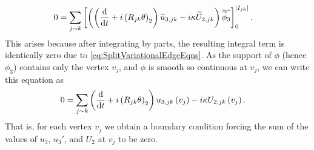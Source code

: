 \begin{align*}
	0 &= \sum_{j\sim k} \left[  \left(  \left( \dfrac{\mathrm{d}}{\mathrm{d}t} + i\left( R_{jk}\theta \right)_2 \right)\widetilde{u}_{3,jk} - i\kappa\widetilde{U}_{2,jk}  \right)\overline{\widetilde{\phi}_3}  \right]_0^{\left\lvert I_{jk} \right\rvert}.
\end{align*}
This arises because after integrating by parts, the resulting integral term is identically zero due to \eqref{eq:SplitVariationalEdgeEqns}.
As the support of $\phi$ (hence $\phi_3$) contains only the vertex $v_j$, and $\phi$ is smooth so continuous at $v_j$, we can write this equation as
\begin{align*}
	0 &= \sum_{j\sim k} \left( \dfrac{\mathrm{d}}{\mathrm{d}t} + i\left( R_{jk}\theta \right)_2 \right)u_{3,jk}\left( v_j \right) - i\kappa U_{2,jk}\left( v_j \right).
\end{align*}
That is, for each vertex $v_j$ we obtain a boundary condition forcing the sum of the values of $u_3$, $u_3'$, and $U_2$ at $v_j$ to be zero. \newline


